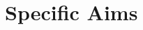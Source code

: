 \documentclass[11pt]{article}  %
\begin{document}
\pagestyle{empty}


%
%
%

\section{Specific Aims}

%
%
\end{document}
